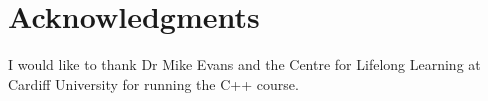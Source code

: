 
\chapter*{Acknowledgments}


I would like to thank Dr Mike Evans and the Centre for Lifelong Learning
at Cardiff University for running the C++ course.
